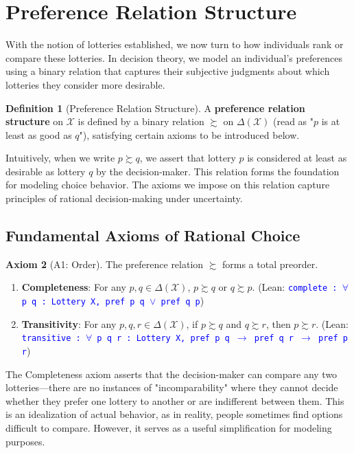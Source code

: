 \documentclass{article}
\theoremstyle{definition}
\newtheorem{definition}{Definition}[section]
\newtheorem{axiom}[definition]{Axiom}
\newcommand{\X}{\mathcal{X}}
\newcommand{\tactic}[1]{\textcolor{blue}{\texttt{#1}}}
\newcommand{\DeltaX}{\Delta(\X)} %
\newcommand{\pref}{\succsim} %
\begin{document}
\section{Preference Relation Structure}\label{suc: preference}

With the notion of lotteries established, we now turn to how individuals rank or compare these lotteries. In decision theory, we model an individual's preferences using a binary relation that captures their subjective judgments about which lotteries they consider more desirable.

\begin{definition}[Preference Relation Structure]\label{def:prefrel}
A \textbf{preference relation structure} on $\X$ is defined by a binary relation $\pref$ on $\DeltaX$ (read as "$p$ is at least as good as $q$"), satisfying certain axioms to be introduced below.
\end{definition}

Intuitively, when we write $p \pref q$, we assert that lottery $p$ is considered at least as desirable as lottery $q$ by the decision-maker. This relation forms the foundation for modeling choice behavior. The axioms we impose on this relation capture principles of rational decision-making under uncertainty.

\subsection{Fundamental Axioms of Rational Choice}

\begin{axiom}[A1: Order]\label{ax:order}
The preference relation $\pref$ forms a total preorder.
\begin{enumerate}[label=(\alph*)]
    \item \textbf{Completeness}: For any $p, q \in \DeltaX$, $p \pref q$ or $q \pref p$.
    (Lean: \tactic{complete : $\forall$ p q : Lottery X, pref p q $\vee$ pref q p})
    \item \textbf{Transitivity}: For any $p, q, r \in \DeltaX$, if $p \pref q$ and $q \pref r$, then $p \pref r$.
    (Lean: \tactic{transitive : $\forall$ p q r : Lottery X, pref p q $\rightarrow$ pref q r $\rightarrow$ pref p r})
\end{enumerate}
\end{axiom}

The Completeness axiom asserts that the decision-maker can compare any two lotteries—there are no instances of "incomparability" where they cannot decide whether they prefer one lottery to another or are indifferent between them. This is an idealization of actual behavior, as in reality, people sometimes find options difficult to compare. However, it serves as a useful simplification for modeling purposes.
\end{document}
